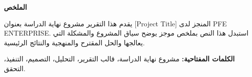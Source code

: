 \documentclass[12pt,a4paper]{article}
\begin{document}
\begin{otherlanguage}{arabic}
\begin{center}{\Huge\bfseries الملخص}\end{center}
\vspace{0.6cm}
يقدم هذا التقرير مشروع نهاية الدراسة بعنوان \textenglish{[Project Title]} المنجز لدى \textenglish{PFE ENTERPRISE}. استبدل هذا النص بملخص موجز يوضح سياق المشروع والمشكلة التي يعالجها والحل المقترح والمنهجية والنتائج الرئيسية.

\vspace{0.8cm}
\noindent\textbf{الكلمات المفتاحية:} مشروع نهاية الدراسة، قالب التقرير، التحليل، التصميم، التنفيذ، التحقق.
\end{otherlanguage}
\end{document}
